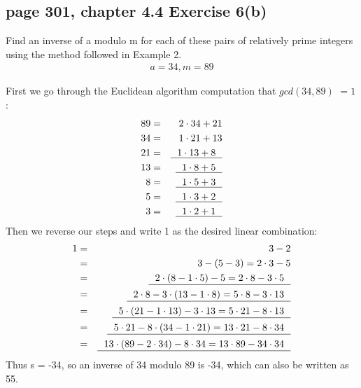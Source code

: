 \documentclass[sigconf]{acmart}
\begin{document}
\subsection{page 301, chapter 4.4 Exercise 6(b)}
\begin{shaded}
    Find an inverse of a modulo m for each of these pairs of relatively prime integers using the method followed in Example 2.
    \begin{eqnarray*}
        a = 34, m = 89
    \end{eqnarray*}
\end{shaded}  
First we go through the Euclidean algorithm computation that $gcd(34, 89)$ $= 1$:
\begin{eqnarray*}
    89 & = & 2 \cdot 34 + 21 \\
    34 & = & 1 \cdot 21 + 13  \\
    21 & = & \uline{~~1 \cdot 13 + 8~~}  \\
    13 & = & \uline{~~1 \cdot 8 + 5~~}  \\
     8 & = & \uline{~~1 \cdot 5 + 3~~}  \\
     5 & = & \uline{~~1 \cdot 3 + 2~~}  \\
     3 & = & \uline{~~1 \cdot 2 + 1~~}
\end{eqnarray*}
Then we reverse our steps and write 1 as the desired linear combination:
\begin{eqnarray*}
    1 & = & 3 - 2 \\
    ~ & = & 3 - (5 - 3) = 2 \cdot 3 - 5  \\
    ~ & = & \uline{~~2 \cdot (8 - 1 \cdot 5) - 5 = 2 \cdot 8 - 3 \cdot 5~~} \\
    ~ & = & \uline{~~2 \cdot 8 - 3 \cdot (13 - 1 \cdot 8) = 5 \cdot 8 - 3 \cdot 13~~} \\
    ~ & = & \uline{~~5 \cdot (21 - 1 \cdot 13) - 3 \cdot 13 = 5 \cdot 21 - 8 \cdot 13~~} \\
    ~ & = & \uline{~~5 \cdot 21 - 8 \cdot (34 - 1 \cdot 21) = 13 \cdot 21 - 8 \cdot 34~~} \\
    ~ & = & \uline{~~13 \cdot (89 - 2 \cdot 34) - 8 \cdot 34 = 13 \cdot 89 - 34 \cdot 34~~} \\
\end{eqnarray*}
Thus s = -34, so an inverse of 34 modulo 89 is -34, which can also be written as 55.
\end{document}
